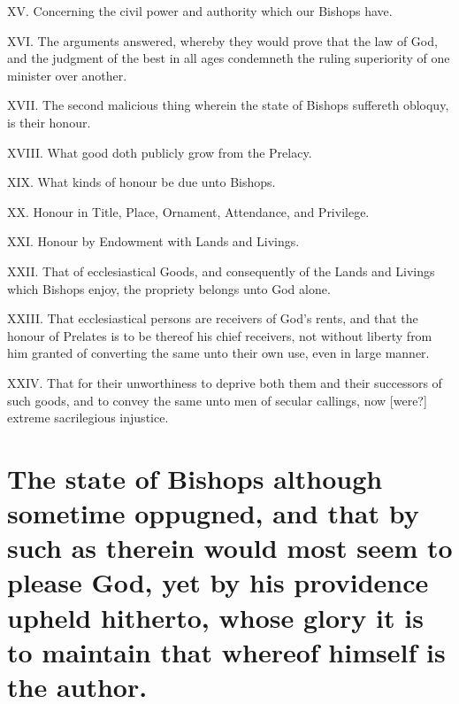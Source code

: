 XV. Concerning the civil power and authority which our Bishops have.

XVI. The arguments answered, whereby they would prove that the law of God, and the judgment of the best in all ages condemneth the ruling superiority of one minister over another. 

XVII. The second malicious thing wherein the state of Bishops suffereth obloquy, is their honour.

XVIII. What good doth publicly grow from the Prelacy.

XIX. What kinds of honour be due unto Bishops.

XX. Honour in Title, Place, Ornament, Attendance, and Privilege.

XXI. Honour by Endowment with Lands and Livings.

XXII. That of ecclesiastical Goods, and consequently of the Lands and Livings which Bishops enjoy, the propriety belongs unto God alone.

XXIII. That ecclesiastical persons are receivers of God’s rents, and that the honour of Prelates is to be thereof his chief receivers, not without liberty from him granted of converting the same unto their own use, even in large manner.

XXIV. That for their unworthiness to deprive both them and their successors of such goods, and to convey the same unto men of secular callings, now [were?] extreme sacrilegious injustice.

\PRLsep

\section*{The state of Bishops although sometime oppugned, and that by such as therein would most seem to please God, yet by his providence upheld hitherto, whose glory it is to maintain that whereof himself is the author.} 

